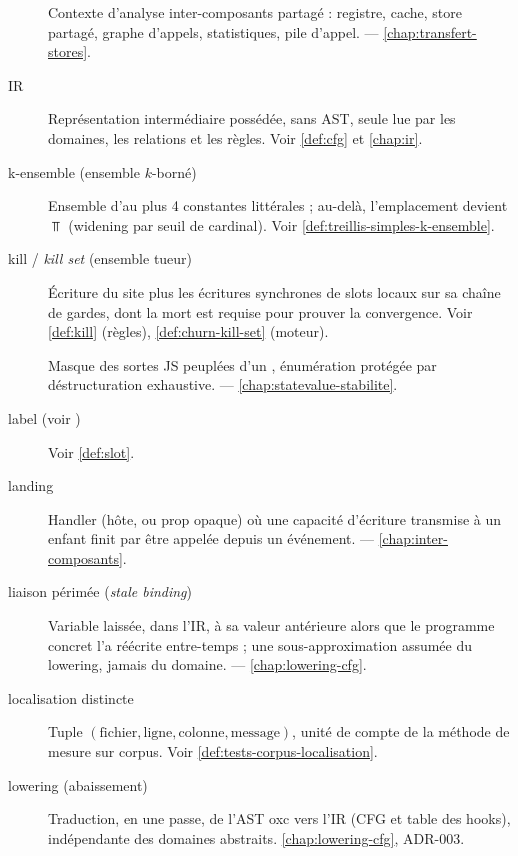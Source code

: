 \begin{description}
\item[] Contexte d'analyse inter-composants partagé : registre, cache, store partagé, graphe d'appels, statistiques, pile d'appel.  — \cref{chap:transfert-stores}.

\item[IR] Représentation intermédiaire possédée, sans AST, seule lue par les domaines, les relations et les règles. Voir \cref{def:cfg} et \cref{chap:ir}.

\item[k-ensemble (ensemble \(k\)-borné)] Ensemble d'au plus 4 constantes littérales ; au-delà, l'emplacement devient \(\Top\) (widening par seuil de cardinal). Voir \cref{def:treillis-simples-k-ensemble}.

\item[kill / \emph{kill set} (ensemble tueur)] Écriture du site plus les écritures synchrones de slots locaux sur sa chaîne de gardes, dont la mort est requise pour prouver la convergence. Voir \cref{def:kill} (règles), \cref{def:churn-kill-set} (moteur).

\item[] Masque des sortes JS peuplées d'un , énumération protégée par déstructuration exhaustive.  — \cref{chap:statevalue-stabilite}.

\item[label (voir )] Voir \cref{def:slot}.

\item[landing] Handler (hôte, ou prop  opaque) où une capacité d'écriture transmise à un enfant finit par être appelée depuis un événement.  — \cref{chap:inter-composants}.

\item[liaison périmée (\emph{stale binding})] Variable laissée, dans l'IR, à sa valeur antérieure alors que le programme concret l'a réécrite entre-temps ; une sous-approximation assumée du lowering, jamais du domaine.  — \cref{chap:lowering-cfg}.

\item[localisation distincte] Tuple \((\text{fichier}, \text{ligne}, \text{colonne}, \text{message})\), unité de compte de la méthode de mesure sur corpus. Voir \cref{def:tests-corpus-localisation}.

\item[lowering (abaissement)] Traduction, en une passe, de l'AST oxc vers l'IR (CFG et table des hooks), indépendante des domaines abstraits. \cref{chap:lowering-cfg}, ADR-003.


\end{description}
